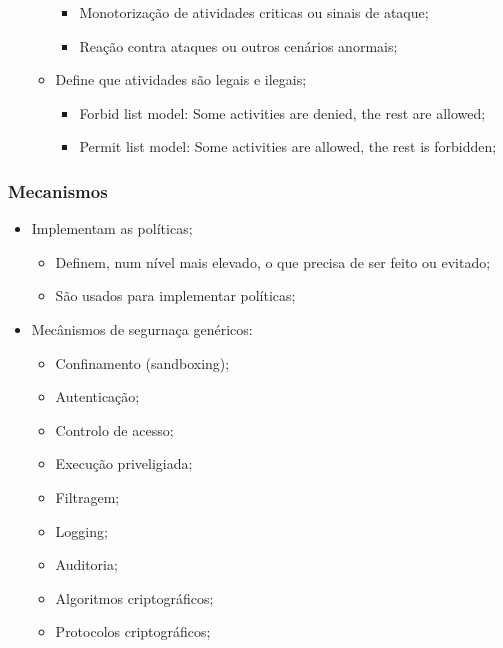\documentclass{article}
\begin{document}
\begin{itemize}
\begin{itemize}
\begin{itemize}
      \item Monotorização de atividades criticas ou sinais de ataque;
      \item Reação contra ataques ou outros cenários anormais;
    \end{itemize}
    \item Define que atividades são legais e ilegais;
    \begin{itemize}
      \item Forbid list model: Some activities are denied, the rest are allowed;
      \item Permit list model: Some activities are allowed, the rest is forbidden;
    \end{itemize}
  \end{itemize}
\end{itemize}

\subsubsection{Mecanismos}

\begin{itemize}
  \item Implementam as políticas;
  \begin{itemize}
    \item Definem, num nível mais elevado, o que precisa de ser feito ou evitado;
    \item São usados para implementar políticas;
  \end{itemize}

  \pagebreak

  \item Mecânismos de segurnaça genéricos:
  \begin{itemize}
    \item Confinamento (sandboxing);
    \item Autenticação;
    \item Controlo de acesso;
    \item Execução priveligiada;
    \item Filtragem;
    \item Logging;
    \item Auditoria;
    \item Algoritmos criptográficos;
    \item Protocolos criptográficos;
  \end{itemize}
\end{itemize}
\end{document}
